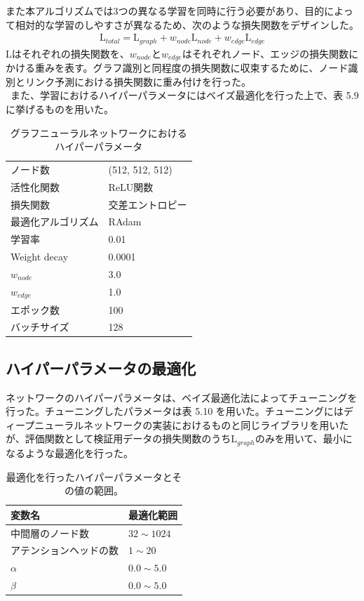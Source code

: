 また本アルゴリズムでは3つの異なる学習を同時に行う必要があり、目的によって相対的な学習のしやすさが異なるため、次のような損失関数をデザインした。\\
\begin{align}
\mathrm{L}_{total} = \mathrm{L}_{graph} + w_{node} \mathrm{L}_{node} + w_{edge} \mathrm{L}_{edge}
\end{align}
$\mathrm{L}$はそれぞれの損失関数を、$w_{node}とw_{edge}$はそれぞれノード、エッジの損失関数にかける重みを表す。グラフ識別と同程度の損失関数に収束するために、ノード識別とリンク予測における損失関数に重み付けを行った。\\
\ また、学習におけるハイパーパラメータにはベイズ最適化を行った上で、表 5.9%
に挙げるものを用いた。
\begin{table}[H]
 \centering
  \begin{tabular}{ l  l }
   \hline
   ノード数 & (512, 512, 512)\\
   活性化関数 & ReLU関数\\
   損失関数 & 交差エントロピー\\
   最適化アルゴリズム & RAdam\\
   学習率 & 0.01\\
   Weight decay & 0.0001\\
    $w_{node}$ & 3.0\\
    $w_{edge}$ & 1.0\\
   エポック数 & 100\\
   バッチサイズ & 128\\
   \hline
  \end{tabular}
  \label{gnnsetting}
  \caption{グラフニューラルネットワークにおけるハイパーパラメータ}
\end{table}
\subsection{ハイパーパラメータの最適化}
ネットワークのハイパーパラメータは、ベイズ最適化法によってチューニングを行った。チューニングしたパラメータは表 5.10%
を用いた。チューニングにはディープニューラルネットワークの実装におけるものと同じライブラリを用いたが、評価関数として検証用データの損失関数のうち$ \mathrm{L}_{graph}$のみを用いて、最小になるような最適化を行った。
\begin{table}[H]
\centering
 \begin{tabular}{ l  l }
 \hline
 変数名 & 最適化範囲\\
 \hline
 \hline
 中間層のノード数 & $32 \sim 1024$\\
 アテンションヘッドの数 & $1 \sim 20$\\
 $\alpha$ & $0.0 \sim 5.0$\\
 $\beta$ & $0.0 \sim 5.0$\\
  \hline
 \end{tabular}
 \label{gnnoptuna}
 \caption{最適化を行ったハイパーパラメータとその値の範囲。}
\end{table}
